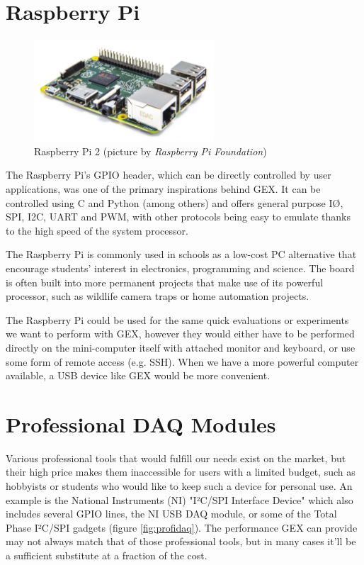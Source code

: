 \section{Raspberry Pi}

\begin{figure}[H]
	\centering
	\includegraphics[width=0.6\textwidth] {img/rpi2.jpg}
	\caption{\label{fig:rpi2}Raspberry Pi 2 (picture by \textit{Raspberry Pi Foundation})}
\end{figure}

The Raspberry Pi's GPIO header, which can be directly controlled by user applications, was one of the primary inspirations behind GEX. It can be controlled using C and Python (among others) and offers general purpose I\O, SPI, I2C, UART and PWM, with other protocols being easy to emulate thanks to the high speed of the system processor.

The Raspberry Pi is commonly used in schools as a low-cost PC alternative that encourage students' interest in electronics, programming and science. The board is often built into more permanent projects that make use of its powerful processor, such as wildlife camera traps or home automation projects.

The Raspberry Pi could be used for the same quick evaluations or experiments we want to perform with GEX, however they would either have to be performed directly on the mini-computer itself with attached monitor and keyboard, or use some form of remote access (e.g. SSH). When we have a more powerful computer available, a USB device like GEX would be more convenient.

\section{Professional DAQ Modules}

Various professional tools that would fulfill our needs exist on the market, but their high price makes them inaccessible for users with a limited budget, such as hobbyists or students who would like to keep such a device for personal use. An example is the National Instruments (NI) "I²C/SPI Interface Device" which also includes several GPIO lines, the NI USB DAQ module, or some of the Total Phase I²C/SPI gadgets (figure \ref{fig:profidaq}). The performance GEX can provide may not always match that of those professional tools, but in many cases it'll be a sufficient substitute at a fraction of the cost.

